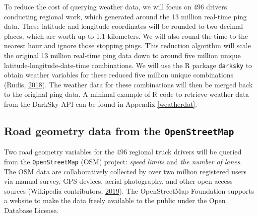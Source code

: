 \documentclass[12pt]{book}
\numberwithin{equation}{chapter}
\begin{document}
To reduce the cost of querying weather data, we will focus on 496 drivers conducting regional work, which generated around the 13 million real-time ping data. These latitude and longitude coordinates will be rounded to two decimal places, which are worth up to 1.1 kilometers. We will also round the time to the nearest hour and ignore those stopping pings. This reduction algorithm will scale the original 13 million real-time ping data down to around five million unique latitude-longitude-date-time combinations. We will use the R package \texttt{darksky} to obtain weather variables for these reduced five million unique combinations (Rudis, \protect\hyperlink{ref-hrbrmstr}{2018}). The weather data for these combinations will then be merged back to the original ping data. A minimal example of R code to retrieve weather data from the DarkSky API can be found in Appendix \ref{weatherdat}.

\begin{table}[H]

\caption{\label{tab:weather}weather from the DarkSky API}
\centering
{}
\end{table}

\hypertarget{road-geometry-data-from-the-openstreetmap}{%
\subsection{\texorpdfstring{Road geometry data from the \texttt{OpenStreetMap}}{Road geometry data from the OpenStreetMap}}\label{road-geometry-data-from-the-openstreetmap}}

Two road geometry variables for the 496 regional truck drivers will be queried from the \texttt{OpenStreetMap} (OSM) project: \emph{speed limits} and \emph{the number of lanes}.
The OSM data are collaboratively collected by over two million registered users via manual survey, GPS devices, aerial photography, and other open-access sources (Wikipedia contributors, \protect\hyperlink{ref-wikiOSM}{2019}).
The OpenStreetMap Foundation supports a website to make the data freely available to the public under the Open Database License.
\end{document}
